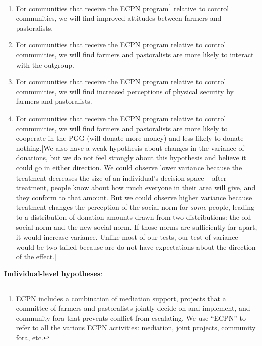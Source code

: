 \documentclass[
]{article}
\providecommand{\tightlist}{%
  \setlength{\itemsep}{0pt}\setlength{\parskip}{0pt}}
\begin{document}
\begin{enumerate}
\def\labelenumi{\arabic{enumi}.}
\tightlist
\item
  For communities that receive the ECPN program\footnote{ECPN includes a
    combination of mediation support, projects that a committee of
    farmers and pastoralists jointly decide on and implement, and
    community fora that prevents conflict from escalating. We use
    ``ECPN'' to refer to all the various ECPN activities: mediation,
    joint projects, community fora, etc.} relative to control
  communities, we will find improved attitudes between farmers and
  pastoralists.
\item
  For communities that receive the ECPN program relative to control
  communities, we will find farmers and pastoralists are more likely to
  interact with the outgroup.
\item
  For communities that receive the ECPN program relative to control
  communities, we will find increased perceptions of physical security
  by farmers and pastoralists.
\item
  For communities that receive the ECPN program relative to control
  communities, we will find farmers and pastoralists are more likely to
  cooperate in the PGG (will donate more money) and less likely to
  donate nothing.{[}We also have a weak hypothesis about changes in the
  variance of donations, but we do not feel strongly about this
  hypothesis and believe it could go in either direction. We could
  observe lower variance because the treatment decreases the size of an
  individual's decision space -- after treatment, people know about how
  much everyone in their area will give, and they conform to that
  amount. But we could observe higher variance because treatment changes
  the perception of the social norm for \emph{some} people, leading to a
  distribution of donation amounts drawn from two distributions: the old
  social norm and the new social norm. If those norms are sufficiently
  far apart, it would increase variance. Unlike most of our tests, our
  test of variance would be two-tailed because are do not have
  expectations about the direction of the effect.{]}
\end{enumerate}

\textbf{Individual-level hypotheses}:
\end{document}
